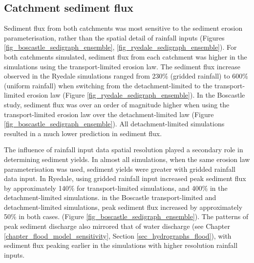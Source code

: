 \subsection{Catchment sediment flux}
Sediment flux from both catchments was most sensitive to the sediment erosion parameterisation, rather than the spatial detail of rainfall inputs (Figures \ref{fig_boscastle_sedigraph_ensemble}, \ref{fig_ryedale_sedigraph_ensemble}). For both catchments simulated, sediment flux from each catchment was higher in the simulations using the transport-limited erosion law. The sediment flux increase observed in the Ryedale simulations ranged from 230\% (gridded rainfall) to 600\% (uniform rainfall) when switching from the detachment-limited to the transport-limited erosion law (Figure \ref{fig_ryedale_sedigraph_ensemble}). In the Boscastle study, sediment flux was over an order of magnitude higher when using the transport-limited erosion law over the detachment-limited law (Figure \ref{fig_boscastle_sedigraph_ensemble}). All detachment-limited simulations resulted in a much lower prediction in sediment flux.

The influence of rainfall input data spatial resolution played a secondary role in determining sediment yields. In almost all simulations, when the same erosion law parameterisation was used, sediment yields were greater with gridded rainfall data input. In Ryedale, using gridded rainfall input increased peak sediment flux by approximately 140\% for transport-limited simulations, and 400\% in the detachment-limited simulations. in the Boscastle transport-limited and detachment-limited simulations, peak sediment flux increased by approximately 50\% in both cases. (Figure \ref{fig_boscastle_sedigraph_ensemble}). The patterns of peak sediment discharge also mirrored that of water discharge (see Chapter \ref{chapter_flood_model_sensitivity}, Section \ref{sec_hydrographs_flood}), with sediment flux peaking earlier in the simulations with higher resolution rainfall inputs. 

